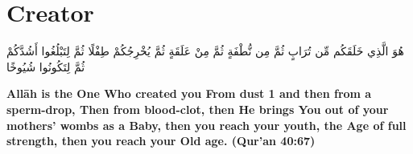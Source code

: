 \chapter{Creator}
\begin{center}
    {\Huge    
        \begin{Arabic}
            هُوَ الَّذِي خَلَقَكُم مِّن تُرَابٍ ثُمَّ مِن نُّطْفَةٍ ثُمَّ مِنْ عَلَقَةٍ ثُمَّ يُخْرِجُكُمْ طِفْلًا ثُمَّ لِتَبْلُغُوا أَشُدَّكُمْ ثُمَّ لِتَكُونُوا شُيُوخًا
        \end{Arabic}
    }
\end{center}
\vspace*{\fill}
\vspace{3cm}
\begin{center}
    \large \textbf{Allāh is the One Who created you From dust 1 and then from a sperm-drop, Then from blood-clot, then He brings You out of your mothers' wombs as a Baby, then you reach your youth, the Age of full strength, then you reach your Old age. (Qur'an 40:67)}
\end{center}
